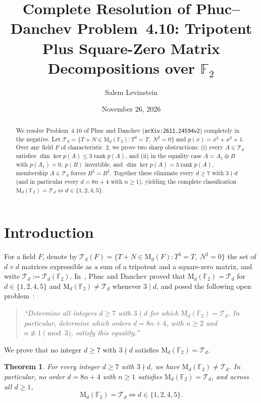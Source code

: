 \documentclass[11pt]{article}
\title{Complete Resolution of Phuc--Danchev Problem~4.10: Tripotent Plus Square-Zero Matrix Decompositions over $\mathbb{F}_2$}
\author{Salem Levinstein}
\date{November 26, 2026}
\newtheorem{theorem}{Theorem}
\begin{document}
\maketitle

\begin{abstract}
We resolve Problem~4.10 of Phuc and Danchev (\texttt{arXiv:2611.24594v2}) completely in the negative. Let $\mathcal{T}_d = \{T + N \in \mathrm{M}_d(\mathbb{F}_2) : T^3 = T,\; N^2 = 0\}$ and $p(x) = x^3 + x^2 + 1$. Over any field $F$ of characteristic~$2$, we prove two sharp obstructions: (i) every $A \in \mathcal{T}_d$ satisfies $\dim \ker p(A) \le 3 \operatorname{rank} p(A)$, and (ii) in the equality case $A = A_1 \oplus B$ with $p(A_1) = 0$, $p(B)$ invertible, and $\dim \ker p(A) = 3 \operatorname{rank} p(A)$, membership $A \in \mathcal{T}_d$ forces $B^3 = B^2$. Together these eliminate every $d \ge 7$ with $3 \nmid d$ (and in particular every $d = 8n + 4$ with $n \ge 1$), yielding the complete classification $\mathrm{M}_d(\mathbb{F}_2) = \mathcal{T}_d \iff d \in \{1, 2, 4, 5\}$.
\end{abstract}

\section{Introduction}

For a field $F$, denote by $\mathcal{T}_d(F) = \{T + N \in \mathrm{M}_d(F) : T^3 = T,\; N^2 = 0\}$ the set of $d \times d$ matrices expressible as a sum of a tripotent and a square-zero matrix, and write $\mathcal{T}_d := \mathcal{T}_d(\mathbb{F}_2)$. In~\cite{PD2026}, Phuc and Danchev proved that $\mathrm{M}_d(\mathbb{F}_2) = \mathcal{T}_d$ for $d \in \{1, 2, 4, 5\}$ and $\mathrm{M}_d(\mathbb{F}_2) \neq \mathcal{T}_d$ whenever $3 \mid d$, and posed the following open problem~\cite[Problem~4.10]{PD2026}:
\begin{quote}
\emph{``Determine all integers $d \ge 7$ with $3 \nmid d$ for which $\mathrm{M}_d(\mathbb{F}_2) = \mathcal{T}_d$. In particular, determine which orders $d = 8n + 4$, with $n \ge 2$ and $n \not\equiv 1 \pmod 3$, satisfy this equality.''}
\end{quote}

We prove that no integer $d \ge 7$ with $3 \nmid d$ satisfies $\mathrm{M}_d(\mathbb{F}_2) = \mathcal{T}_d$.

\begin{theorem}\label{thm:main}
For every integer $d \ge 7$ with $3 \nmid d$, we have $\mathrm{M}_d(\mathbb{F}_2) \neq \mathcal{T}_d$. In particular, no order $d = 8n + 4$ with $n \ge 1$ satisfies $\mathrm{M}_d(\mathbb{F}_2) = \mathcal{T}_d$, and across all $d \ge 1$,
\[
  \mathrm{M}_d(\mathbb{F}_2) = \mathcal{T}_d \iff d \in \{1, 2, 4, 5\}.
\]
\end{theorem}
\end{document}
